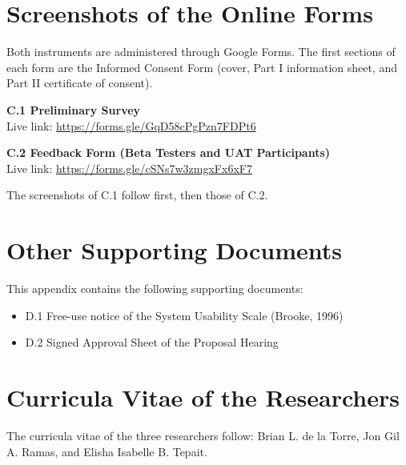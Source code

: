 \chapter{Screenshots of the Online Forms}\label{app:forms}
\noindent Both instruments are administered through Google Forms. The first sections of each form are the Informed Consent Form (cover, Part I information sheet, and Part II certificate of consent).
\vspace{6pt}

\noindent\textbf{C.1 Preliminary Survey}\\
Live link: \url{https://forms.gle/GqD58cPgPzn7FDPt6}

\vspace{6pt}
\noindent\textbf{C.2 Feedback Form (Beta Testers and UAT Participants)}\\
Live link: \url{https://forms.gle/cSNs7w3zmgxFx6xF7}

\vspace{6pt}
\noindent The screenshots of C.1 follow first, then those of C.2.

\chapter{Other Supporting Documents}\label{app:other}
\noindent This appendix contains the following supporting documents:
\begin{itemize}[leftmargin=*]
  \item D.1 Free-use notice of the System Usability Scale (Brooke, 1996)
  \item D.2 Signed Approval Sheet of the Proposal Hearing
\end{itemize}

\chapter{Curricula Vitae of the Researchers}\label{app:cvres}
\noindent The curricula vitae of the three researchers follow: Brian L. de la Torre, Jon Gil A. Ramas, and Elisha Isabelle B. Tepait.

